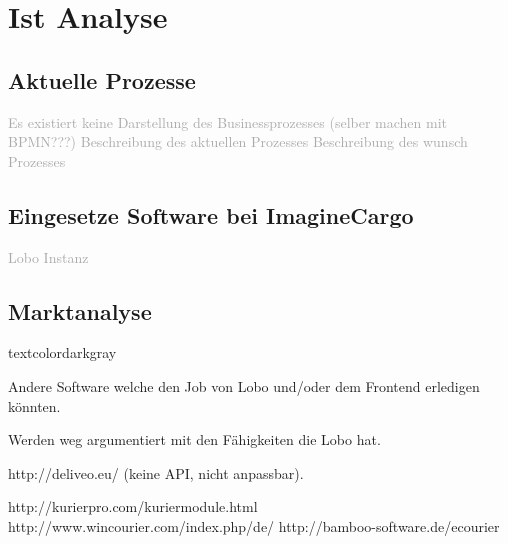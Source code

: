 \chapter{Ist Analyse}
\label{sec:istanalyse}

\section{Aktuelle Prozesse}
\textcolor{darkgray}{
  Es existiert keine Darstellung des Businessprozesses (selber machen mit BPMN???)
  Beschreibung des aktuellen Prozesses
  Beschreibung des wunsch Prozesses
}
\section{Eingesetze Software bei ImagineCargo}
\textcolor{darkgray}{
  Lobo Instanz
}


\section{Marktanalyse}
textcolor{darkgray}{
	Andere Software welche den Job von Lobo und/oder dem Frontend erledigen könnten.

	Werden weg argumentiert mit den Fähigkeiten die Lobo hat.

	http://deliveo.eu/ (keine API, nicht anpassbar).

    http://kurierpro.com/kuriermodule.html
    http://www.wincourier.com/index.php/de/
    http://bamboo-software.de/ecourier
}
